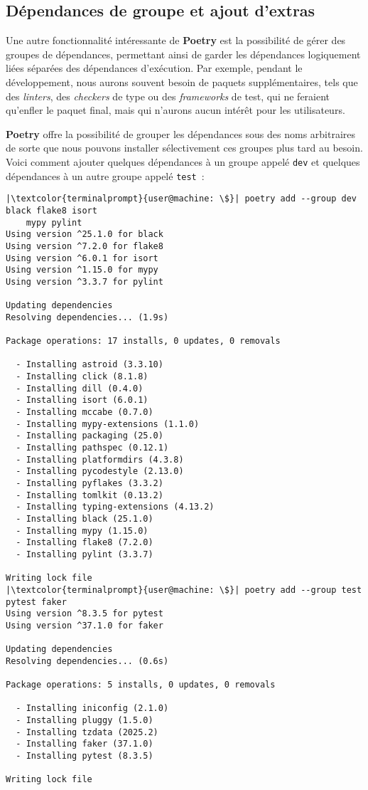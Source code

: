 \subsection*{Dépendances de groupe et ajout d’extras}
Une autre fonctionnalité intéressante de \textbf{Poetry} est la possibilité de gérer des groupes de dépendances, permettant ainsi de garder les dépendances logiquement liées séparées des dépendances d’exécution. Par exemple, pendant le développement, nous aurons souvent besoin de paquets supplémentaires, tels que des \textit{linters}, des \textit{checkers} de type ou des \textit{frameworks} de test, qui ne feraient qu’enfler le paquet final, mais qui n'aurons aucun intérêt pour les utilisateurs.

\textbf{Poetry} offre la possibilité de grouper les dépendances sous des noms arbitraires de sorte que nous pouvons installer sélectivement ces groupes plus tard au besoin. Voici comment ajouter quelques dépendances à un groupe appelé \texttt{dev} et quelques dépendances à un autre groupe appelé \texttt{test} :
\begin{lstlisting}[style=terminal]
|\textcolor{terminalprompt}{user@machine: \$}| poetry add --group dev black flake8 isort 
    mypy pylint
Using version ^25.1.0 for black
Using version ^7.2.0 for flake8
Using version ^6.0.1 for isort
Using version ^1.15.0 for mypy
Using version ^3.3.7 for pylint

Updating dependencies
Resolving dependencies... (1.9s)

Package operations: 17 installs, 0 updates, 0 removals

  - Installing astroid (3.3.10)
  - Installing click (8.1.8)
  - Installing dill (0.4.0)
  - Installing isort (6.0.1)
  - Installing mccabe (0.7.0)
  - Installing mypy-extensions (1.1.0)
  - Installing packaging (25.0)
  - Installing pathspec (0.12.1)
  - Installing platformdirs (4.3.8)
  - Installing pycodestyle (2.13.0)
  - Installing pyflakes (3.3.2)
  - Installing tomlkit (0.13.2)
  - Installing typing-extensions (4.13.2)
  - Installing black (25.1.0)
  - Installing mypy (1.15.0)
  - Installing flake8 (7.2.0)
  - Installing pylint (3.3.7)

Writing lock file
|\textcolor{terminalprompt}{user@machine: \$}| poetry add --group test pytest faker
Using version ^8.3.5 for pytest
Using version ^37.1.0 for faker

Updating dependencies
Resolving dependencies... (0.6s)

Package operations: 5 installs, 0 updates, 0 removals

  - Installing iniconfig (2.1.0)
  - Installing pluggy (1.5.0)
  - Installing tzdata (2025.2)
  - Installing faker (37.1.0)
  - Installing pytest (8.3.5)

Writing lock file
\end{lstlisting}

